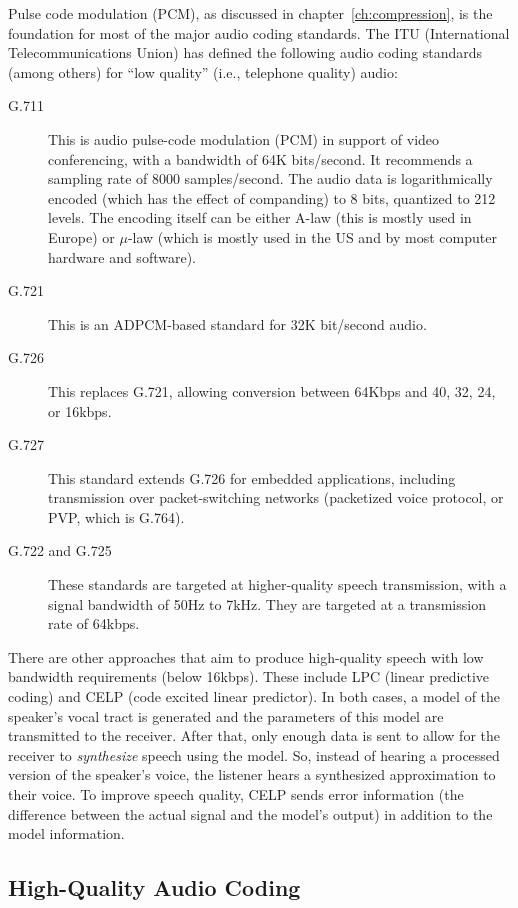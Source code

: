 Pulse code modulation (PCM), as discussed in
chapter~\ref{ch:compression}, is the foundation for most of the major
audio coding standards. The ITU (International Telecommunications
Union) has defined the following audio coding standards (among others)
for ``low quality'' (i.e., telephone quality) audio:

\begin{description}
\item[G.711] This is audio pulse-code modulation (PCM) in support of video
conferencing, with a bandwidth of 64K bits/second.  It recommends a
sampling rate of 8000 samples/second.  The audio data is
logarithmically encoded (which has the effect of companding) to 8
bits, quantized to 212 levels. The encoding itself can be either A-law
(this is mostly used in Europe) or $\mu$-law (which is mostly used in
the US and by most computer hardware and software).
\item[G.721] This is an ADPCM-based standard for 32K bit/second audio.
\item[G.726] This replaces G.721, allowing conversion between 64Kbps
and 40, 32, 24, or 16kbps.
\item[G.727] This standard extends G.726 for embedded applications,
including transmission over packet-switching networks (packetized
voice protocol, or PVP, which is G.764).
\item[G.722 and G.725] These standards are targeted at higher-quality
speech transmission, with a signal bandwidth of 50Hz to 7kHz. They are
targeted at a transmission rate of 64kbps.
\end{description}

There are other approaches that aim to produce high-quality speech
with low bandwidth requirements (below 16kbps). These include LPC
(linear predictive coding) and CELP (code excited linear
predictor). In both cases, a model of the speaker's vocal tract is
generated and the parameters of this model are transmitted to the
receiver. After that, only enough data is sent to allow for the
receiver to \emph{synthesize} speech using the model. So, instead of
hearing a processed version of the speaker's voice, the listener hears
a synthesized approximation to their voice. To improve speech quality, 
CELP sends error information (the difference between the actual signal 
and the model's output) in addition to the model information.

\subsection{High-Quality Audio Coding}

